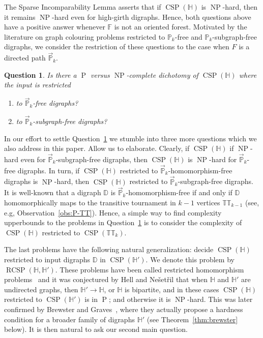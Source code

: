 \documentclass{article}
\newtheorem{question}{Question}
\theoremstyle{definition}
\theoremstyle{remark}
\DeclareMathOperator{\NP}{NP}
\DeclareMathOperator{\cP}{P}
\DeclareMathOperator{\CSP}{CSP}
\DeclareMathOperator{\RCSP}{RCSP}
\newcommand{\bD}{{\mathbb D}}
\newcommand{\bF}{{\mathbb F}}
\newcommand{\bH}{{\mathbb H}}
\newcommand{\bP}{{\mathbb P}}
\newcommand{\bT}{{\mathbb T}}
\begin{document}
The Sparse Incomparability Lemma asserts that if $\CSP(\bH)$ is $\NP$-hard,
then it remains $\NP$-hard even for high-girth digraphs. Hence,
both questions above have a positive answer whenever $\bF$ is not
an oriented forest. Motivated by the literature on graph colouring problems
restricted to $\bP_k$-free and $\bP_k$-subgraph-free digraphs, we
consider the restriction of these questions to the case when $F$ is a
directed path $\vec{\bP}_k$. 

\begin{question}\label{qst:Pk}
    Is there a $\cP$ versus $\NP$-complete dichotomy of $\CSP(\bH)$ where the input
    is restricted 
    \begin{enumerate}
        \item to $\vec{\bP}_k$-free digraphs?
        \item to $\vec{\bP}_k$-subgraph-free digraphs?
    \end{enumerate}
\end{question}

In our effort to settle Question~\ref{qst:Pk} we stumble into three more
questions which we also address in this paper. Allow us to elaborate.
Clearly, if $\CSP(\bH)$ if $\NP$-hard even for $\vec{\bP}_k$-subgraph-free digraphs, 
then $\CSP(\bH)$ is $\NP$-hard for $\vec{\bP}_k$-free digraphs. In turn, 
if $\CSP(\bH)$ restricted to $\vec{\bP}_k$-homomorphism-free digraphs is $\NP$-hard, 
then $\CSP(\bH)$ restricted to $\vec{\bP}_k$-subgraph-free digraphs.  It is well-known
that a digraph $\bD$ is $\vec{\bP}_k$-homomorphism-free if and only if $\bD$ homomorphically
maps to the transitive tournament in $k-1$ vertices $\bT\bT_{k-1}$ (see, e.g,
Observation~\ref{obs:P-TT}).
Hence, a simple way to find complexity upperbounds to the problems in 
Question~\ref{qst:Pk} is to consider the complexity of $\CSP(\bH)$ restricted to
$\CSP(\bT\bT_k)$.

The last problems have the following natural generalization:
decide $\CSP(\bH)$ restricted to input digraphs $\bD$ in $\CSP(\bH')$.
We denote this problem by $\RCSP(\bH,\bH')$. These problems have been
called restricted homomorphism problems~\cite{BHM97,brewsterDAM156}
and  it was conjectured by Hell and Ne\v{s}et\v{r}il that when $\bH$ and $\bH'$
are undirected graphs, then  $\bH'\to \bH$, or $\bH$ is bipartite, and in 
these cases $\CSP(\bH)$ restricted to $\CSP(\bH')$ is in $\cP$;
and otherwise it is $\NP$-hard. This was later confirmed by 
Brewster and Graves~\cite{brewsterDAM156}, where they actually propose a
hardness condition for a broader family of digraphs $\bH'$ (see
Theorem~\ref{thm:brewster} below). It is then natural to ask our second main question.
\end{document}
